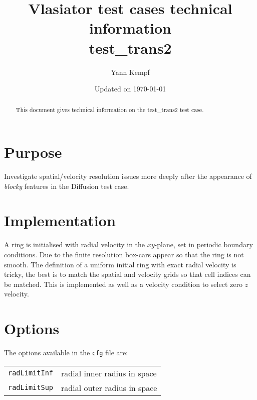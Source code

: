 \documentclass[a4paper,10pt]{scrartcl}
\title{
\Huge{Vlasiator test cases technical information} \\
\LARGE{test\_trans2}
}
\author{Yann Kempf}
\date{Updated on \today}
\begin{document}
\maketitle

\begin{abstract}
   This document gives technical information on the test\_trans2 test case.
\end{abstract}

\section{Purpose}
Investigate spatial/velocity resolution issues more deeply after the appearance of \textit{blocky} features in the Diffusion test case.


\section{Implementation}
A ring is initialised with radial velocity in the $xy$-plane, set in periodic boundary conditions. Due to the finite resolution box-cars appear so that the ring is not smooth. The definition of a uniform initial ring with exact radial velocity is tricky, the best is to match the spatial and velocity grids so that cell indices can be matched. This is implemented as well as a velocity condition to select zero $z$ velocity.

\section{Options}
The options available in the \verb=cfg= file are:

\begin{tabularx}{\textwidth}{lX}
   \verb=radLimitInf= & radial inner radius in space \\
   \verb=radLimitSup= & radial outer radius in space
\end{tabularx}
\end{document}
